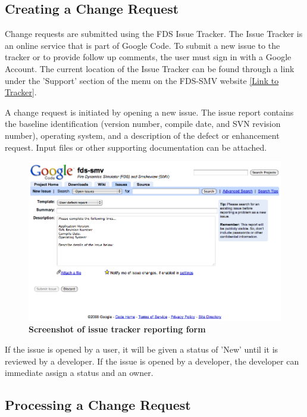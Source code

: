 \documentclass[11pt]{book}
\begin{document}
\subsection{Creating a Change Request}

Change requests are submitted using the FDS Issue Tracker.  The Issue Tracker is an online service that is part of
Google Code.  To submit a new issue to the tracker or to provide follow up comments, the user must sign in with a Google Account.
The current location of the Issue Tracker can be found through a link under the 'Support' section of the menu
on the FDS-SMV website \href{http://code.google.com/p/fds-smv/issues/list}{[Link to Tracker]}.

A change request is initiated by opening a new issue.  The issue report contains the baseline identification (version number, compile date, and SVN revision number),
operating system, and a description of the defect or enhancement request.  Input files or other supporting documentation can be attached.

\begin{figure}[ht!]
\includegraphics[width=\textwidth]{FIGURES/NewIssue.jpg}
\caption{\bf Screenshot of issue tracker reporting form}
\label{fig:issueform}
\end{figure}

If the issue is opened by a user, it will be given a status of 'New' until it is reviewed by a developer.  If the
issue is opened by a developer, the developer can immediate assign a status and an owner.

\subsection{Processing a Change Request}
\end{document}
